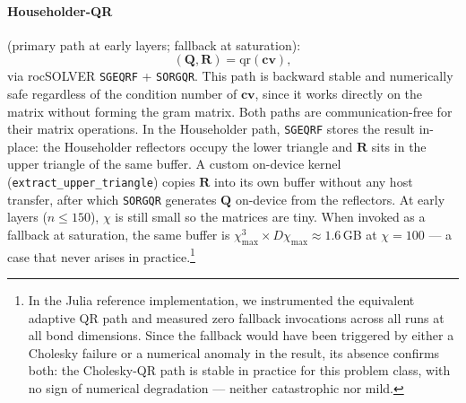 \documentclass[11pt]{article}
\newcommand{\chimax}{\chi_{\mathrm{max}}}
\begin{document}
\paragraph{Householder-QR} (primary path at early layers; fallback at saturation):
\[
  (\mathbf{Q}, \mathbf{R}) = \mathrm{qr}(\mathbf{cv}),
\]
via rocSOLVER \texttt{SGEQRF} + \texttt{SORGQR}. This path is backward stable
and numerically safe regardless of the condition number of $\mathbf{cv}$,
since it works directly on the matrix without forming the gram matrix.
Both paths are communication-free for their matrix operations.
In the Householder path, \texttt{SGEQRF} stores the result
in-place: the Householder reflectors occupy the lower triangle and $\mathbf{R}$
sits in the upper triangle of the same buffer. A custom on-device kernel
(\texttt{extract\_upper\_triangle}) copies $\mathbf{R}$ into its own buffer
without any host transfer, after which \texttt{SORGQR} generates $\mathbf{Q}$
on-device from the reflectors.
At early layers ($n \leq 150$), $\chi$ is still small so the matrices are tiny.
When invoked as a fallback at saturation, the same buffer is
$\chimax^3 \times D\chimax \approx 1.6$\,GB at $\chi=100$ --- a case that
never arises in practice.\footnote{In the Julia
reference implementation, we instrumented the equivalent adaptive QR path and
measured zero fallback invocations across all runs at all bond dimensions.
Since the fallback would have been triggered by either a Cholesky failure
or a numerical anomaly in the result, its absence confirms both: the
Cholesky-QR path is stable in practice for this problem class, with no
sign of numerical degradation --- neither catastrophic nor mild.}
\end{document}
